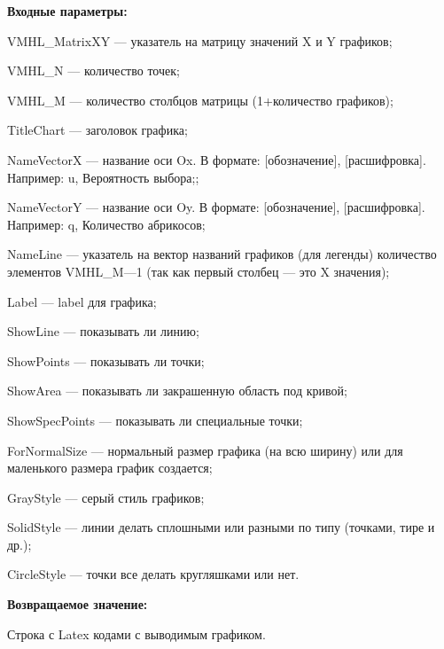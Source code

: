 \textbf{Входные параметры:}
 
VMHL\_MatrixXY --- указатель на матрицу значений X и Y графиков;
 
VMHL\_N --- количество точек;
 
VMHL\_M --- количество столбцов матрицы (1+количество графиков);
 
TitleChart --- заголовок графика;
 
NameVectorX --- название оси Ox. В формате: [обозначение], [расшифровка]. Например: u, Вероятность выбора;;
 
NameVectorY --- название оси Oy. В формате: [обозначение], [расшифровка]. Например: q, Количество абрикосов;
 
NameLine --- указатель на вектор названий графиков (для легенды) количество элементов VMHL\_M---1 (так как первый столбец --- это X значения);
 
Label --- label для графика;
 
ShowLine --- показывать ли линию;
 
ShowPoints --- показывать ли точки;
 
ShowArea --- показывать ли закрашенную область под кривой;
 
ShowSpecPoints --- показывать ли специальные точки;
 
ForNormalSize --- нормальный размер графика (на всю ширину) или для маленького размера график создается;
 
GrayStyle --- серый стиль графиков;
 
SolidStyle --- линии делать сплошными или разными по типу (точками, тире и др.);
 
CircleStyle --- точки все делать кругляшками или нет.
	
\textbf{Возвращаемое значение:}

Строка с Latex кодами с выводимым графиком.
